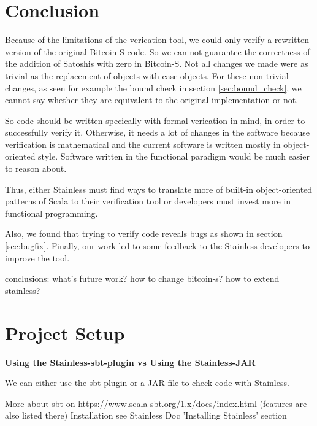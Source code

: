 \documentclass[runningheads]{llncs}
\renewcommand{\paragraph}{\textbf}%
\newcommand{\todo}[1]{{\par \color{red}#1}}
\begin{document}
\section{Conclusion}
\label{chap:conclusion}

Because of the limitations of the verication tool, we could only
verify a rewritten version of the original Bitcoin-S code.  So we can
not guarantee the correctness of the addition of Satoshis with zero in
Bitcoin-S.  Not all changes we made were as trivial as the replacement
of objects with case objects.  For these non-trivial changes, as seen
for example the bound check in section \ref{sec:bound_check}, we
cannot say whether they are equivalent to the original implementation
or not.

So code should be written specically with formal verication in mind,
in order to successfully verify it.  Otherwise, it needs a lot of
changes in the software because verification is mathematical and the
current software is written mostly in object-oriented style.  Software
written in the functional paradigm would be much easier to reason
about.

Thus, either Stainless must find ways to translate more of built-in
object-oriented patterns of Scala to their verification tool or
developers must invest more in functional programming.

Also, we found that trying to verify code reveals bugs as shown in
section \ref{sec:bugfix}.  Finally, our work led to some feedback to
the Stainless developers to improve the tool.

\todo{conclusions: what's future work? how to
  change bitcoin-s? how to extend stainless?}





\clearpage
\appendix

\section{Project Setup}

\paragraph{Using the Stainless-sbt-plugin vs Using the Stainless-JAR}

We can either use the sbt plugin or a JAR file to check code with Stainless.

More about sbt on https://www.scala-sbt.org/1.x/docs/index.html (features are also listed there)
Installation see Stainless Doc 'Installing Stainless' section
\end{document}
